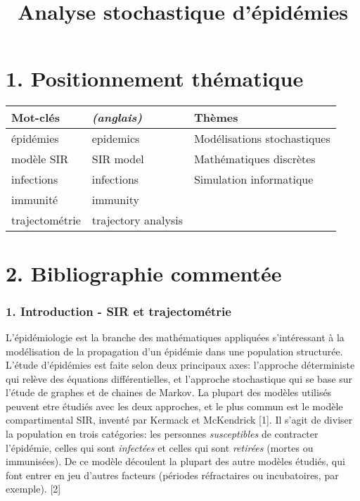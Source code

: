 \documentclass{article}
\begin{document}
\title{Analyse stochastique d'épidémies}\author{}
\maketitle

\section{1. Positionnement thématique}

\begin{tabular}{ |l | l | l| }
 Mot-clés        &  \textit{(anglais)}          &  Thèmes                              \\
\hline

 épidémies       &  epidemics            &  Modélisations stochastiques         \\

 modèle SIR      &  SIR model            &  Mathématiques discrètes             \\

 infections      &  infections           &  Simulation informatique             \\

 immunité        &  immunity             &                                      \\

 trajectométrie  &  trajectory analysis  &                                      \\

\end{tabular}

\section{2. Bibliographie commentée}

\subsubsection{1. Introduction - SIR et trajectométrie}

L'épidémiologie est la branche des mathématiques appliquées s'intéressant à la modélisation de la propagation d'un épidémie dans une population structurée. L'étude d'épidémies est faite selon deux principaux axes: l'approche déterministe qui relève des équations différentielles, et l'approche stochastique qui se base sur l'étude de graphes et de chaines de Markov.
La plupart des modèles utilisés peuvent etre étudiés avec les deux approches, et le plus commun est le modèle compartimental SIR, inventé par Kermack et McKendrick [1]. Il s'agit de diviser la population en trois catégories: les personnes \textit{susceptibles} de contracter l'épidémie, celles qui sont \textit{infectées} et celles qui sont \textit{retirées} (mortes ou immunisées).
De ce modèle découlent la plupart des autre modèles étudiés, qui font entrer en jeu d'autres facteurs (périodes réfractaires ou incubatoires, par exemple). [2]
\end{document}
